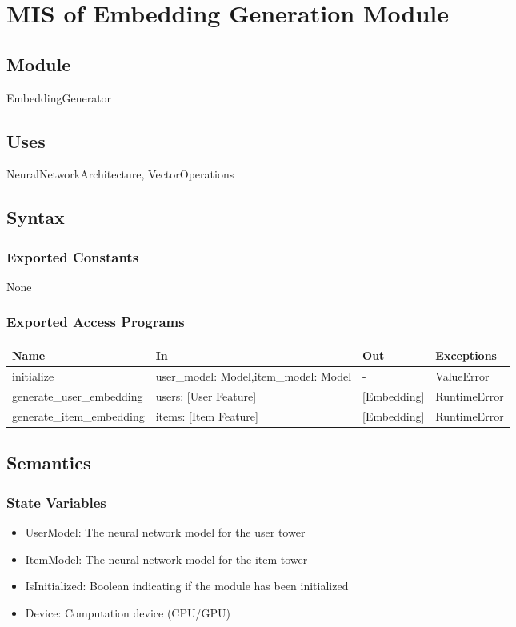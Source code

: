 \documentclass[12pt, titlepage]{article}
\begin{document}
\newpage

\section{MIS of Embedding Generation Module} \label{ModuleEG}

\subsection{Module}

EmbeddingGenerator

\subsection{Uses}
NeuralNetworkArchitecture, VectorOperations

\subsection{Syntax}

\subsubsection{Exported Constants}
None
\subsubsection{Exported Access Programs}

\begin{center}
  \begin{tabular}{p{5cm} p{4cm} p{4cm} p{3cm}}
  \hline
  \textbf{Name} & \textbf{In} & \textbf{Out} & \textbf{Exceptions} \\
  \hline
  initialize & user\_model: Model,item\_model: Model & - & ValueError \\
  \hline
  generate\_user\_embedding & users: [User Feature] & [Embedding] & RuntimeError\\
  \hline
  generate\_item\_embedding & items: [Item Feature] & [Embedding] & RuntimeError\\
  \hline
  \end{tabular}
\end{center}

\subsection{Semantics}

\subsubsection{State Variables}
\begin{itemize}
  \item UserModel: The neural network model for the user tower
  \item ItemModel: The neural network model for the item tower
  \item IsInitialized: Boolean indicating if the module has been initialized
  \item Device: Computation device (CPU/GPU)
\end{itemize}
\end{document}
